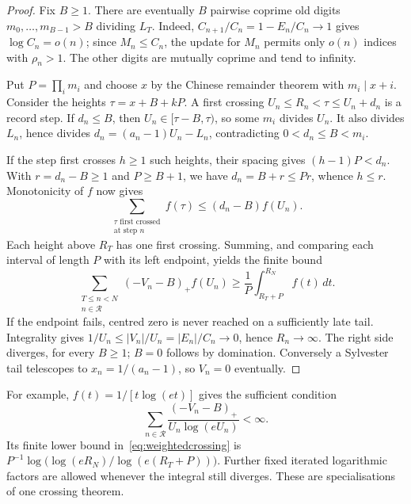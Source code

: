 \documentclass[11pt]{article}
\begin{document}
\begin{proof}
Fix $B\ge1$. There are eventually $B$ pairwise coprime old digits
$m_0,\ldots,m_{B-1}>B$ dividing $L_T$. Indeed,
$C_{n+1}/C_n=1-E_n/C_n\to1$ gives $\log C_n=o(n)$; since
$M_n\le C_n$, the update for $M_n$ permits only $o(n)$ indices with
$\rho_n>1$. The other digits are mutually coprime and tend to infinity.

Put $P=\prod_i m_i$ and choose $x$ by the Chinese remainder theorem with
$m_i\mid x+i$. Consider the heights $\tau=x+B+kP$. A first crossing
$U_n\le R_n<\tau\le U_n+d_n$ is a record step. If $d_n\le B$, then
$U_n\in[\tau-B,\tau)$, so some $m_i$ divides $U_n$. It also divides
$L_n$, hence divides $d_n=(a_n-1)U_n-L_n$, contradicting
$0<d_n\le B<m_i$.

If the step first crosses $h\ge1$ such heights, their spacing gives
$(h-1)P<d_n$. With $r=d_n-B\ge1$ and $P\ge B+1$, we have
$d_n=B+r\le Pr$, whence $h\le r$. Monotonicity of $f$ now gives
\[
 \sum_{\substack{\tau\text{ first crossed}\\\text{at step }n}}f(\tau)
 \le(d_n-B)f(U_n).
\]
Each height above $R_T$ has one first crossing. Summing, and comparing each
interval of length $P$ with its left endpoint, yields the finite bound
\begin{equation}\label{eq:weightedcrossing}
 \sum_{\substack{T\le n<N\\n\in\mathcal R}}(-V_n-B)_+f(U_n)
 \ge\frac1P\int_{R_T+P}^{R_N} f(t)\,dt.
\end{equation}
If the endpoint fails, centred zero is never reached on a sufficiently late
tail. Integrality gives $1/U_n\le|V_n|/U_n=|E_n|/C_n\to0$, hence
$R_n\to\infty$. The right side diverges, for every $B\ge1$; $B=0$ follows
by domination. Conversely a Sylvester tail telescopes to
$x_n=1/(a_n-1)$, so $V_n=0$ eventually.
\end{proof}

For example, $f(t)=1/[t\log(et)]$ gives the sufficient condition
\[
 \sum_{n\in\mathcal R}\frac{(-V_n-B)_+}{U_n\log(eU_n)}<\infty.
\]
Its finite lower bound in~\eqref{eq:weightedcrossing} is
$P^{-1}\log\bigl(\log(eR_N)/\log(e(R_T+P))\bigr)$.
Further fixed iterated logarithmic factors are allowed whenever the integral
still diverges. These are specialisations of one crossing theorem.
\end{document}

